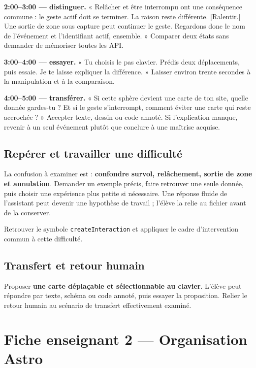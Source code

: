 \documentclass[
  canadien,
  11pt,
  a4paper,
]{report}
\begin{document}
\textbf{2:00--3:00 --- distinguer.} « Relâcher et être interrompu ont
une conséquence commune : le geste actif doit se terminer. La raison
reste différente. {[}Ralentir.{]} Une sortie de zone sous capture peut
continuer le geste. Regardons donc le nom de l'événement et
l'identifiant actif, ensemble. » Comparer deux états sans demander de
mémoriser toutes les API.

\textbf{3:00--4:00 --- essayer.} « Tu choisis le pas clavier. Prédis
deux déplacements, puis essaie. Je te laisse expliquer la différence. »
Laisser environ trente secondes à la manipulation et à la comparaison.

\textbf{4:00--5:00 --- transférer.} « Si cette sphère devient une carte
de ton site, quelle donnée gardes-tu ? Et si le geste s'interrompt,
comment éviter une carte qui reste accrochée ? » Accepter texte, dessin
ou code annoté. Si l'explication manque, revenir à un seul événement
plutôt que conclure à une maîtrise acquise.

\section{Repérer et travailler une
difficulté}\label{repuxe9rer-et-travailler-une-difficultuxe9}

La confusion à examiner est : \textbf{confondre survol, relâchement,
sortie de zone et annulation}. Demander un exemple précis, faire
retrouver une seule donnée, puis choisir une expérience plus petite si
nécessaire. Une réponse fluide de l'assistant peut devenir une hypothèse
de travail ; l'élève la relie au fichier avant de la conserver.

Retrouver le symbole \texttt{create\allowbreak{}Interaction} et appliquer le cadre
d'intervention commun à cette difficulté.

\section{Transfert et retour humain}\label{transfert-et-retour-humain}

Proposer \textbf{une carte déplaçable et sélectionnable au clavier}.
L'élève peut répondre par texte, schéma ou code annoté, puis essayer la
proposition. Relier le retour humain au scénario de transfert
effectivement examiné.

\chapter{Fiche enseignant 2 --- Organisation
Astro}\label{fiche-enseignant-2-organisation-astro}
\end{document}
